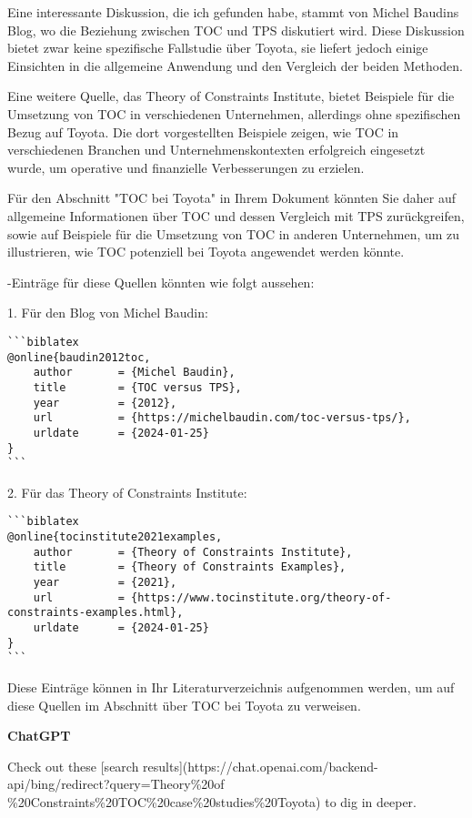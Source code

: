 Eine interessante Diskussion, die ich gefunden habe, stammt von Michel Baudins Blog, wo die Beziehung zwischen TOC und TPS diskutiert wird. Diese Diskussion bietet zwar keine spezifische Fallstudie über Toyota, sie liefert jedoch einige Einsichten in die allgemeine Anwendung und den Vergleich der beiden Methoden.

Eine weitere Quelle, das Theory of Constraints Institute, bietet Beispiele für die Umsetzung von TOC in verschiedenen Unternehmen, allerdings ohne spezifischen Bezug auf Toyota. Die dort vorgestellten Beispiele zeigen, wie TOC in verschiedenen Branchen und Unternehmenskontexten erfolgreich eingesetzt wurde, um operative und finanzielle Verbesserungen zu erzielen.

Für den Abschnitt "TOC bei Toyota" in Ihrem Dokument könnten Sie daher auf allgemeine Informationen über TOC und dessen Vergleich mit TPS zurückgreifen, sowie auf Beispiele für die Umsetzung von TOC in anderen Unternehmen, um zu illustrieren, wie TOC potenziell bei Toyota angewendet werden könnte.

\BibTeX{}-Einträge für diese Quellen könnten wie folgt aussehen:

1. Für den Blog von Michel Baudin:

\begin{verbatim}
```biblatex
@online{baudin2012toc,
	author       = {Michel Baudin},
	title        = {TOC versus TPS},
	year         = {2012},
	url          = {https://michelbaudin.com/toc-versus-tps/},
	urldate      = {2024-01-25}
}
```
\end{verbatim}

2. Für das Theory of Constraints Institute:

\begin{verbatim}
```biblatex
@online{tocinstitute2021examples,
	author       = {Theory of Constraints Institute},
	title        = {Theory of Constraints Examples},
	year         = {2021},
	url          = {https://www.tocinstitute.org/theory-of-constraints-examples.html},
	urldate      = {2024-01-25}
}
```
\end{verbatim}

Diese Einträge können in Ihr Literaturverzeichnis aufgenommen werden, um auf diese Quellen im Abschnitt über TOC bei Toyota zu verweisen.

\textbf{ChatGPT}

Check out these [search results](https://chat.openai.com/backend-api/bing/redirect?query=Theory\%20of \\
\%20Constraints\%20TOC\%20case\%20studies\%20Toyota) to dig in deeper.

